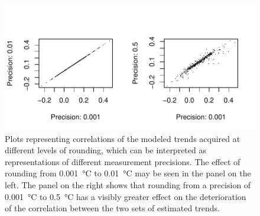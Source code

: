 \documentclass[]{ametsoc}
\begin{document}
\begin{figure}
\centering \includegraphics[width=1.0\textwidth]{figure08}
\caption{Plots representing correlations of the modeled trends acquired at different levels of rounding, which can be interpreted as representations of different measurement precisions. The effect of rounding from \SI{0.001}{\degreeCelsius} to \SI{0.01}{\degreeCelsius} may be seen in the panel on the left. The panel on the right shows that rounding from a precision of \SI{0.001}{\degreeCelsius} to \SI{0.5}{\degreeCelsius} has a visibly greater effect on the deterioration of the correlation between the two sets of estimated trends.}
\label{figure08}
\end{figure}
\end{document}
